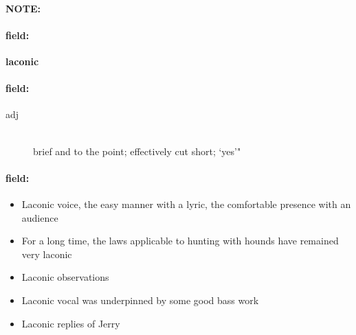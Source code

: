 \documentclass[12pt]{article}
\newenvironment{note}{\paragraph{NOTE:}}{}
\newenvironment{field}{\paragraph{field:}}{}
\begin{document}
\begin{note}
\begin{field}
\textbf{\large laconic}
\end{field}


\begin{field}
\begin{description}
\item[adj] \hfill \\ 
brief and to the point; effectively cut short; `yes'"

\end{description}
\end{field}

\begin{field}
\begin{itemize}
\item Laconic voice, the easy manner with a lyric, the comfortable presence with an audience
\item For a long time, the laws applicable to hunting with hounds have remained very laconic
\item Laconic observations
\item Laconic vocal was underpinned by some good bass work
\item Laconic replies of Jerry
\end{itemize}
\end{field}
\end{note}
\end{document}
